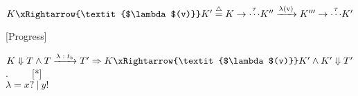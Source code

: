 \begin{definition}
   
   $K\xRightarrow{\textit{$\lambda$(v)}}K'\overset{\triangle}{=}K\rightarrow \overset{\tau}{\cdots}K''\xrightarrow{\text{$\lambda$(v)}}K'''\rightarrow \overset{\tau}{\cdots} K'$  

\end{definition}




\begin{theorem} [Progress] 

\begin{center}
    
    $K \Downarrow T \wedge T\xrightarrow{\textit{$\lambda:t_b$}}T' \Rightarrow K\xRightarrow{\textit{$\lambda$(v)}}K' \wedge K'\Downarrow T'$. $\ \ \ \ \ \ \ \ $ [*]\\
    
    $\lambda=x?\ |\ y!$\\
 
    
    
\end{center}

\end{theorem}

